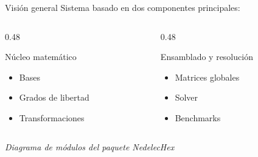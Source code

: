 \documentclass[aspectratio=169,11pt]{beamer}
\begin{document}
\begin{frame}{Visión general}
  Sistema basado en dos componentes principales:

  \vspace{4mm}
  \begin{columns}[T]
    \begin{column}{0.48\textwidth}
      \begin{block}{Núcleo matemático}
        \begin{itemize}
          \item Bases
          \item Grados de libertad
          \item Transformaciones
        \end{itemize}
      \end{block}
    \end{column}
    \begin{column}{0.48\textwidth}
      \begin{block}{Ensamblado y resolución}
        \begin{itemize}
          \item Matrices globales
          \item Solver
          \item Benchmarks
        \end{itemize}
      \end{block}
    \end{column}
  \end{columns}

  \vspace{4mm}
  \begin{center}
    \footnotesize\itshape
    Diagrama de módulos del paquete NedelecHex
  \end{center}
\end{frame}
\end{document}
